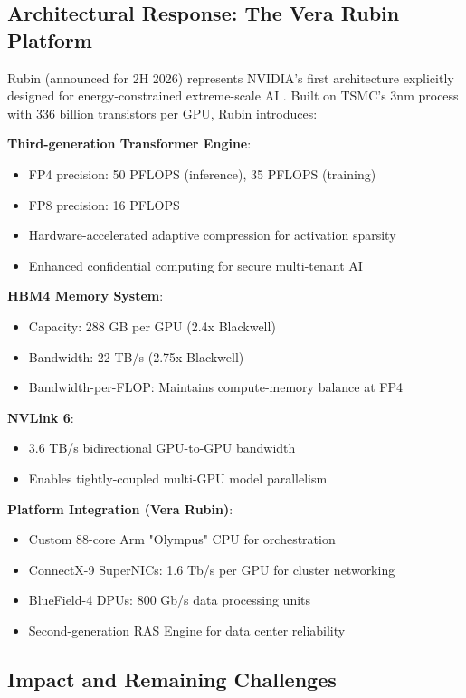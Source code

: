 \documentclass{article}
\begin{document}
\subsection{Architectural Response: The Vera Rubin Platform}

Rubin (announced for 2H 2026) represents NVIDIA's first architecture explicitly designed for energy-constrained extreme-scale AI \cite{nvidia2024rubin}. Built on TSMC's 3nm process with 336 billion transistors per GPU, Rubin introduces:

\textbf{Third-generation Transformer Engine}:
\begin{itemize}
\item FP4 precision: 50 PFLOPS (inference), 35 PFLOPS (training)
\item FP8 precision: 16 PFLOPS
\item Hardware-accelerated adaptive compression for activation sparsity
\item Enhanced confidential computing for secure multi-tenant AI
\end{itemize}

\textbf{HBM4 Memory System}:
\begin{itemize}
\item Capacity: 288 GB per GPU (2.4x Blackwell)
\item Bandwidth: 22 TB/s (2.75x Blackwell)
\item Bandwidth-per-FLOP: Maintains compute-memory balance at FP4
\end{itemize}

\textbf{NVLink 6}:
\begin{itemize}
\item 3.6 TB/s bidirectional GPU-to-GPU bandwidth
\item Enables tightly-coupled multi-GPU model parallelism
\end{itemize}

\textbf{Platform Integration (Vera Rubin)}:
\begin{itemize}
\item Custom 88-core Arm "Olympus" CPU for orchestration
\item ConnectX-9 SuperNICs: 1.6 Tb/s per GPU for cluster networking
\item BlueField-4 DPUs: 800 Gb/s data processing units
\item Second-generation RAS Engine for data center reliability
\end{itemize}

\subsection{Impact and Remaining Challenges}
\end{document}
